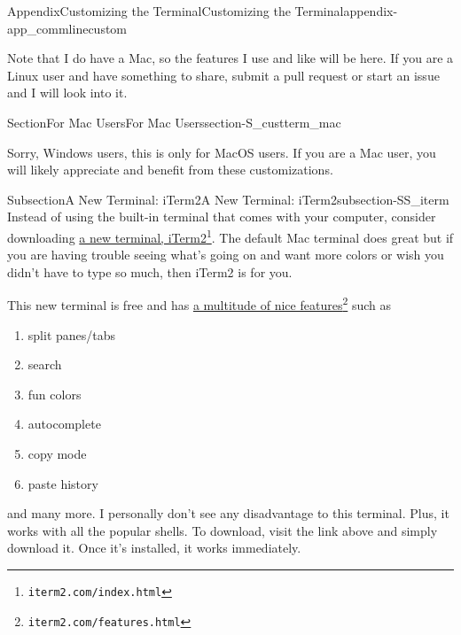 \documentclass[twoside,10pt,]{book}
\begin{document}
\begin{appendixptx}{Appendix}{Customizing the Terminal}{}{Customizing the Terminal}{}{}{appendix-app_commlinecustom}
\renewcommand*{\appendixname}{Appendix}
%
\begin{introduction}{}%
Note that I do have a Mac, so the features I use and like will be here. If you are a Linux user and have something to share, submit a pull request or start an issue and I will look into it.%
\end{introduction}%
%
%
\typeout{************************************************}
\typeout{************************************************}
%
\begin{sectionptx}{Section}{For Mac Users}{}{For Mac Users}{}{}{section-S_custterm_mac}
%
\begin{introduction}{}%
Sorry, Windows users, this is only for MacOS users. If you are a Mac user, you will likely appreciate and benefit from these customizations.%
\end{introduction}%
%
%
\typeout{************************************************}
\typeout{************************************************}
%
\begin{subsectionptx}{Subsection}{A New Terminal: iTerm2}{}{A New Terminal: iTerm2}{}{}{subsection-SS_iterm}
%
Instead of using the built-in terminal that comes with your computer, consider downloading \href{https://iterm2.com/index.html}{a new terminal, iTerm2}\footnote{\nolinkurl{iterm2.com/index.html}\label{fn-SS_iterm-c-b}}. The default Mac terminal does great but if you are having trouble seeing what's going on and want more colors or wish you didn't have to type so much, then iTerm2 is for you.%
\par
This new terminal is free and has \href{https://iterm2.com/features.html}{a multitude of nice features}\footnote{\nolinkurl{iterm2.com/features.html}\label{fn-SS_iterm-d-b}} such as%
\begin{enumerate}
\item{}split panes\slash{}tabs%
\item{}search%
\item{}fun colors%
\item{}autocomplete%
\item{}copy mode%
\item{}paste history%
\end{enumerate}
and many more. I personally don't see any disadvantage to this terminal. Plus, it works with all the popular shells. To download, visit the link above and simply download it. Once it's installed, it works immediately.%

\end{subsectionptx}
\end{sectionptx}
\end{appendixptx}
\end{document}
